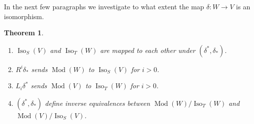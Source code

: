 \documentclass{amsproc}
\def\Iso{\operatorname{Iso}}
\def\Qch{\operatorname {Mod}}
\def\r{\rightarrow}
\newtheorem{theorems}[lemmas]{Theorem}
\theoremstyle{definition}
\theoremstyle{remark}
\numberwithin{equation}{section}
\numberwithin{table}{section}
\numberwithin{figure}{section}
\begin{document}
In the next few paragraphs we investigate to what extent the map
$\delta:W\r V$ is an isomorphism.  

\begin{theorems}
\label{ref:9.1.9a}
\begin{enumerate}
\item
$\Iso_S(V)$ and $\Iso_T(W)$  are mapped  to each other under
$(\delta^\ast,\delta_\ast)$.
\item
$R^i\delta_\ast$ sends $\Qch(W)$ to $\Iso_S(V)$ for $i>0$.
\item
$L_i\delta^\ast$ sends $\Qch(V)$ to $\Iso_T(W)$ for $i>0$.
\item
$(\delta^\ast,\delta_\ast)$ define inverse equivalences between
$\Qch(W)/\Iso_T(W)$ and $\Qch(V)/\Iso_S(V)$.
\end{enumerate}
\end{theorems}
\end{document}
